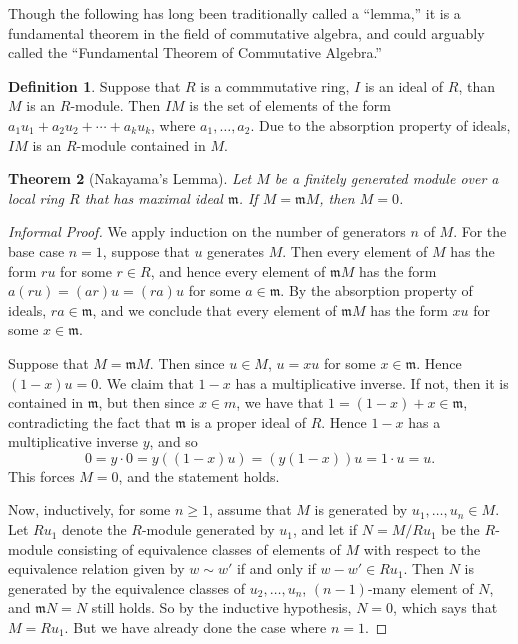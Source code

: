\documentclass[12pt]{article}
\newtheorem{theorem}{Theorem}[section]
\theoremstyle{definition}
\newtheorem{definition}[theorem]{Definition}
\theoremstyle{remark}
\begin{document}
Though the following has long been traditionally called a ``lemma,'' it is a fundamental theorem in the field of commutative algebra, and could arguably called the ``Fundamental Theorem of Commutative Algebra.''

\begin{definition}
	Suppose that $R$ is a commmutative ring, $I$ is an ideal of $R$, than $M$ is an $R$-module.  Then $IM$ is the set of elements of the form 
	$a_1 u_1 + a_2 u_2 + \cdots + a_k u_k$, where $a_1, \ldots, a_2$.  
Due to the absorption property of ideals, $IM$ is an $R$-module contained in $M$. 	
\end{definition}


\begin{theorem}[Nakayama's Lemma]
	Let $M$ be a finitely generated module over a local ring $R$ that has maximal ideal $\mathfrak m$. 
	If $M = \mathfrak{m}M$, then $M=0$. 
\end{theorem}

\begin{proof}[Informal Proof]
We apply induction on the number of generators $n$ of $M$. 
For the base case $n=1$, suppose that $u$ generates $M$.	
Then every element of $M$ has the form $ru$ for some $r \in R$, and hence every element of $\mathfrak{m}M$ has the form $a(ru) = (ar)u = (ra)u$ for some $a \in    \mathfrak{m}$.  By the absorption property of ideals, $ra \in \mathfrak{m}$, and we conclude that every element of $\mathfrak{m}M$ has the form $xu$ for some $x \in \mathfrak{m}$. 

Suppose that $M = \mathfrak{m} M$.  Then since $u \in M$, $u = xu$ for some $x \in \mathfrak{m}$.  Hence $(1-x) u = 0$. We claim that $1-x$ has a multiplicative inverse. If not, then it is contained in $\mathfrak{m}$, but then since $x \in m$, we have that $1 = (1-x)+x \in \mathfrak{m}$, contradicting the fact that $\mathfrak{m}$ is a proper ideal of $R$.  Hence $1-x$ has a multiplicative inverse $y$, and so \[ 0 = y \cdot 0= y((1-x)u) = (y(1-x)) u = 1 \cdot u = u. \]  This forces $M=0$, and the statement holds. 

Now, inductively, for some $n \geq 1$,  assume that $M$ is generated by $u_1, \ldots, u_n \in M$.  Let $Ru_1$ denote the $R$-module generated by $u_1$, and let 
 if $N = M/R u_1$ be the $R$-module consisting of equivalence classes of elements of $M$ with respect to the equivalence relation given by $w \sim w'$ if and only if $w - w' \in R u_1$.  Then $N$ is generated by the equivalence classes of $u_2, \ldots, u_n$, $(n-1)$-many element of $N$, and $\mathfrak{m}N = N$ still holds.  
 So by the inductive hypothesis, $N=0$, which says that $M = R u_1$.  But we have already done the case where $n=1$. 
\end{proof}
\end{document}
